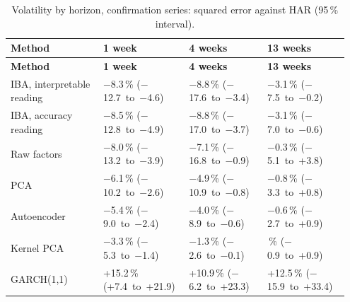 {\scriptsize\setlength{\tabcolsep}{4pt}\renewcommand{\arraystretch}{1.2}
\begin{longtable}{@{}>{\raggedright\arraybackslash}p{0.267\linewidth}>{\raggedright\arraybackslash}p{0.225\linewidth}>{\raggedright\arraybackslash}p{0.225\linewidth}>{\raggedright\arraybackslash}p{0.236\linewidth}@{}}
\caption{Volatility by horizon, confirmation series: squared error against HAR (95\,\% interval).}\label{tab:5}\\
\toprule
\textbf{Method} & \textbf{1 week} & \textbf{4 weeks} & \textbf{13 weeks} \\
\midrule
\endfirsthead
\toprule
\textbf{Method} & \textbf{1 week} & \textbf{4 weeks} & \textbf{13 weeks} \\
\midrule
\endhead
\bottomrule
\endlastfoot
IBA, interpretable reading & \ensuremath{-}8.3\,\% (\ensuremath{-}12.7~to~\ensuremath{-}4.6) & \ensuremath{-}8.8\,\% (\ensuremath{-}17.6~to~\ensuremath{-}3.4) & \ensuremath{-}3.1\,\% (\ensuremath{-}7.5~to~\ensuremath{-}0.2) \\
IBA, accuracy reading & \ensuremath{-}8.5\,\% (\ensuremath{-}12.8~to~\ensuremath{-}4.9) & \ensuremath{-}8.8\,\% (\ensuremath{-}17.0~to~\ensuremath{-}3.7) & \ensuremath{-}3.1\,\% (\ensuremath{-}7.0~to~\ensuremath{-}0.6) \\
Raw factors & \ensuremath{-}8.0\,\% (\ensuremath{-}13.2~to~\ensuremath{-}3.9) & \ensuremath{-}7.1\,\% (\ensuremath{-}16.8~to~\ensuremath{-}0.9) & \ensuremath{-}0.3\,\% (\ensuremath{-}5.1~to~+3.8) \\
PCA & \ensuremath{-}6.1\,\% (\ensuremath{-}10.2~to~\ensuremath{-}2.6) & \ensuremath{-}4.9\,\% (\ensuremath{-}10.9~to~\ensuremath{-}0.8) & \ensuremath{-}0.8\,\% (\ensuremath{-}3.3~to~+0.8) \\
Autoencoder & \ensuremath{-}5.4\,\% (\ensuremath{-}9.0~to~\ensuremath{-}2.4) & \ensuremath{-}4.0\,\% (\ensuremath{-}8.9~to~\ensuremath{-}0.6) & \ensuremath{-}0.6\,\% (\ensuremath{-}2.7~to~+0.9) \\
Kernel PCA & \ensuremath{-}3.3\,\% (\ensuremath{-}5.3~to~\ensuremath{-}1.4) & \ensuremath{-}1.3\,\% (\ensuremath{-}2.6~to~\ensuremath{-}0.1) & 0.0\,\% (\ensuremath{-}0.9~to~+0.9) \\
GARCH(1,1) & +15.2\,\% (+7.4~to~+21.9) & +10.9\,\% (\ensuremath{-}6.2~to~+23.3) & +12.5\,\% (\ensuremath{-}15.9~to~+33.4) \\
\end{longtable}}
